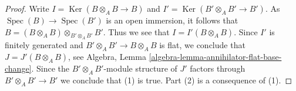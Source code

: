 \documentclass[10pt,a4paper]{amsart}
\theoremstyle{plain}
\theoremstyle{definition}
\theoremstyle{remark}
\numberwithin{equation}{subsection}
\def\Spec{\mathop{\mathrm{Spec}}}
\def\Ker{\mathop{\mathrm{Ker}}}
\begin{document}
\begin{proof}
Write $I = \Ker(B \otimes_A B \to B)$ and $I' = \Ker(B' \otimes_A B' \to B')$.
As $\Spec(B) \to \Spec(B')$ is an open immersion, it follows that
$B = (B \otimes_A B) \otimes_{B' \otimes_A B'} B'$. Thus we see that
$I = I'(B \otimes_A B)$. Since $I'$ is finitely generated and
$B' \otimes_A B' \to B \otimes_A B$ is flat, we conclude that
$J = J'(B \otimes_A B)$, see
Algebra, Lemma \ref{algebra-lemma-annihilator-flat-base-change}.
Since the $B' \otimes_A B'$-module structure of $J'$
factors through $B' \otimes_A B' \to B'$ we conclude that (1) is true.
Part (2) is a consequence of (1).
\end{proof}
\end{document}
